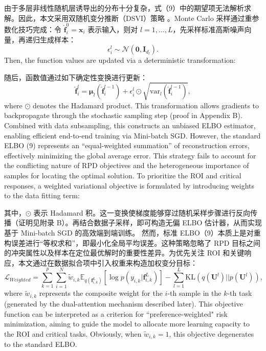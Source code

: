\documentclass[11pt]{article}
\begin{document}
由于多层非线性随机层诱导出的分布十分复杂，式（9）中的期望项无法解析求解。因此，本文采用双随机变分推断（DSVI）策略 \cite{Salimbeni2017}。Monte Carlo 采样通过重参数化技巧完成：令 $\hat{\mathbf{f}}_i^0 = \mathbf{x}_i$ 表示输入，则对 $l=1, \dots, L$，先采样标准高斯噪声向量，再递归生成样本：
\begin{equation}
	\epsilon _{i}^{l}\sim\mathcal{N}(\mathbf{0},{{\mathbf{I}}_{{{d}_{l}}}}).
\end{equation}
Then, the function values are updated via a deterministic transformation:

随后，函数值通过如下确定性变换进行更新：
\begin{equation}
	\widehat{\mathbf{f}}_{i}^{l}={{\mathbf{\mu }}_{l}}(\widehat{\mathbf{f}}_{i}^{l-1})+\epsilon _{i}^{l}\odot \sqrt{\text{va}{{\text{r}}_{l}}(\widehat{\mathbf{f}}_{i}^{l-1})},
\end{equation}
where $\odot$ denotes the Hadamard product. This transformation allows gradients to backpropagate through the stochastic sampling step (proof in Appendix B). Combined with data subsampling, this constructs an unbiased ELBO estimator, enabling efficient end-to-end training via Mini-batch SGD.
However, the standard ELBO (9) represents an ``equal-weighted summation'' of reconstruction errors, effectively minimizing the global average error. This strategy fails to account for the conflicting nature of RPD objectives and the heterogeneous importance of samples for locating the optimal solution. To prioritize the ROI and critical responses, a weighted variational objective is formulated by introducing weights to the data fitting term:

其中，$\odot$ 表示 Hadamard 积。这一变换使梯度能够穿过随机采样步骤进行反向传播（证明见附录 B）。再结合数据子采样，即可构造无偏 ELBO 估计器，从而实现基于 Mini-batch SGD 的高效端到端训练。
然而，标准 ELBO（9）本质上是对重构误差进行“等权求和”，即最小化全局平均误差。这种策略忽略了 RPD 目标之间的冲突属性以及样本在定位最优解时的重要性差异。为优先关注 ROI 和关键响应，本文通过在数据拟合项中引入权重来构造加权变分目标：
\begin{equation}
	{{\mathcal{L}}_{Weighted}}=\sum\limits_{k=1}^{p}{\sum\limits_{i=1}^{N}{{{{\tilde{w}}}_{i,k}}}}{{\mathbb{E}}_{q(\mathbf{f}_{i,k}^{L})}}[\log p({{y}_{i,k}}|\mathbf{f}_{i,k}^{L})]-\sum\limits_{l=1}^{L}{\text{KL}}(q({{\mathbf{U}}^{l}})||p({{\mathbf{U}}^{l}})),
\end{equation}
where $\tilde{w}_{i,k}$ represents the composite weight for the $i$-th sample in the $k$-th task (generated by the dual-attention mechanism described later). This objective function can be interpreted as a criterion for ``preference-weighted" risk minimization, aiming to guide the model to allocate more learning capacity to the ROI and critical tasks. Obviously, when $\tilde{w}_{i,k}=1$, this objective degenerates to the standard ELBO.
\end{document}
